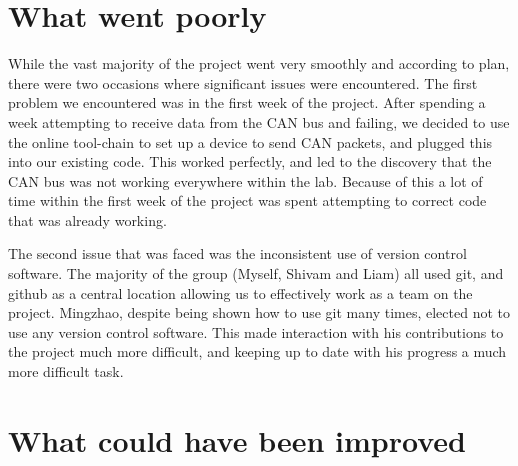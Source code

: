 \section{What went poorly}

While the vast majority of the project went very smoothly and according to plan, 
there were two occasions where significant issues were encountered. The first 
problem we encountered was in the first week of the project. After spending a 
week attempting to receive data from the CAN bus and failing, we decided to use 
the online tool-chain to set up a device to send CAN packets, and plugged this 
into our existing code. This worked perfectly, and led to the discovery that 
the CAN bus was not working everywhere within the lab. Because of this a lot of 
time within the first week of the project was spent attempting to correct code 
that was already working. 
\par\bigskip\noindent
The second issue that was faced was the inconsistent use of version control 
software. The majority of the group (Myself, Shivam and Liam) all used git, and 
github as a central location allowing us to effectively work as a team on the 
project. Mingzhao, despite being shown how to use git many times, elected not 
to use any version control software. This made interaction with his contributions
to the project much more difficult, and keeping up to date with his progress a 
much more difficult task. 

\section{What could have been improved}

